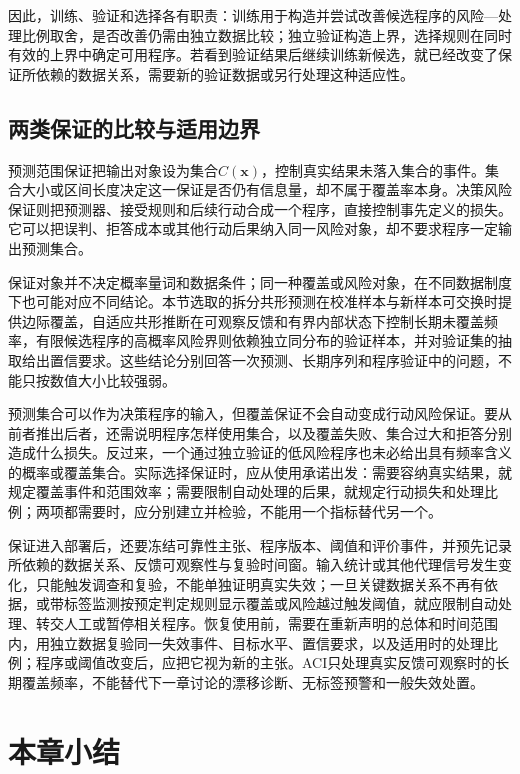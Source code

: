 因此，训练、验证和选择各有职责：训练用于构造并尝试改善候选程序的风险—处理比例取舍，是否改善仍需由独立数据比较；独立验证构造上界，选择规则在同时有效的上界中确定可用程序。若看到验证结果后继续训练新候选，就已经改变了保证所依赖的数据关系，需要新的验证数据或另行处理这种适应性。

\subsection{两类保证的比较与适用边界}

预测范围保证把输出对象设为集合$C(\bm{x})$，控制真实结果未落入集合的事件。集合大小或区间长度决定这一保证是否仍有信息量，却不属于覆盖率本身。决策风险保证则把预测器、接受规则和后续行动合成一个程序，直接控制事先定义的损失。它可以把误判、拒答成本或其他行动后果纳入同一风险对象，却不要求程序一定输出预测集合。

保证对象并不决定概率量词和数据条件；同一种覆盖或风险对象，在不同数据制度下也可能对应不同结论。本节选取的拆分共形预测在校准样本与新样本可交换时提供边际覆盖，自适应共形推断在可观察反馈和有界内部状态下控制长期未覆盖频率，有限候选程序的高概率风险界则依赖独立同分布的验证样本，并对验证集的抽取给出置信要求。这些结论分别回答一次预测、长期序列和程序验证中的问题，不能只按数值大小比较强弱。

预测集合可以作为决策程序的输入，但覆盖保证不会自动变成行动风险保证。要从前者推出后者，还需说明程序怎样使用集合，以及覆盖失败、集合过大和拒答分别造成什么损失。反过来，一个通过独立验证的低风险程序也未必给出具有频率含义的概率或覆盖集合。实际选择保证时，应从使用承诺出发：需要容纳真实结果，就规定覆盖事件和范围效率；需要限制自动处理的后果，就规定行动损失和处理比例；两项都需要时，应分别建立并检验，不能用一个指标替代另一个。

保证进入部署后，还要冻结可靠性主张、程序版本、阈值和评价事件，并预先记录所依赖的数据关系、反馈可观察性与复验时间窗。输入统计或其他代理信号发生变化，只能触发调查和复验，不能单独证明真实失效；一旦关键数据关系不再有依据，或带标签监测按预定判定规则显示覆盖或风险越过触发阈值，就应限制自动处理、转交人工或暂停相关程序。恢复使用前，需要在重新声明的总体和时间范围内，用独立数据复验同一失效事件、目标水平、置信要求，以及适用时的处理比例；程序或阈值改变后，应把它视为新的主张。ACI只处理真实反馈可观察时的长期覆盖频率，不能替代下一章讨论的漂移诊断、无标签预警和一般失效处置。

\section{本章小结}
\label{sec:reliability-summary}

